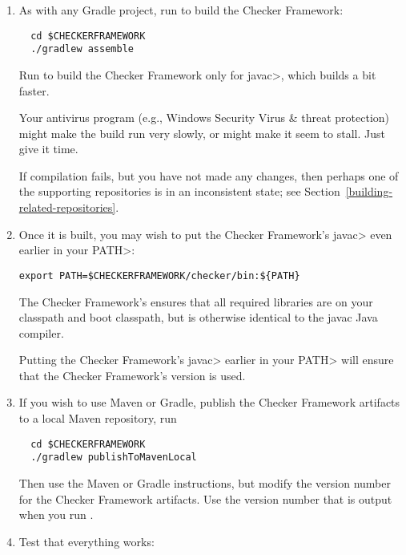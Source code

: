 \begin{enumerate}

\item
As with any Gradle project, run  to build the Checker Framework:

\begin{Verbatim}
  cd $CHECKERFRAMEWORK
  ./gradlew assemble
\end{Verbatim}

Run  to build the Checker Framework only for
\<javac>, which builds a bit faster.

\noindent
Your antivirus program (e.g., Windows Security Virus \& threat protection)
might make the build run very slowly, or might make it seem to stall.  Just
give it time.

If compilation fails, but you have not made any changes, then perhaps one
of the supporting repositories is in an inconsistent state; see
Section~\ref{building-related-repositories}.

\item
Once it is built, you may wish to put the Checker Framework's \<javac>
even earlier in your \<PATH>:

\begin{Verbatim}
export PATH=$CHECKERFRAMEWORK/checker/bin:${PATH}
\end{Verbatim}

The Checker Framework's  ensures that all required
libraries are on your classpath and boot classpath, but is otherwise
identical to the javac Java compiler.

Putting the Checker Framework's \<javac> earlier in your \<PATH> will
ensure that the Checker Framework's version is used.

\item
If you wish to use Maven or Gradle, publish the Checker Framework artifacts to a local Maven repository, run
\begin{Verbatim}
  cd $CHECKERFRAMEWORK
  ./gradlew publishToMavenLocal
\end{Verbatim}
Then use the Maven or Gradle instructions, but modify the version number for the Checker Framework artifacts.
Use the version number that is output when you run .

\item Test that everything works:

  \begin{itemize}


\end{itemize}
\end{enumerate}
